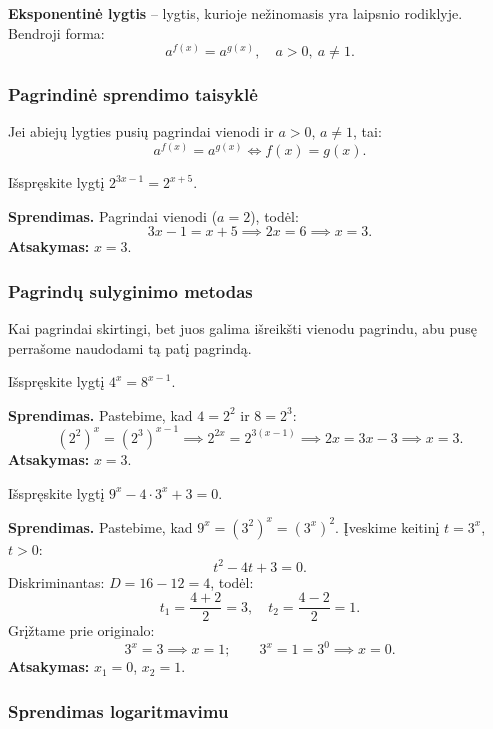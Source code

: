 \begin{definition}
\textbf{Eksponentinė lygtis} – lygtis, kurioje nežinomasis yra laipsnio rodiklyje.
Bendroji forma:
\[
    a^{f(x)} = a^{g(x)}, \quad a > 0,\ a \neq 1.
\]
\end{definition}

\subsubsection*{Pagrindinė sprendimo taisyklė}

Jei abiejų lygties pusių pagrindai vienodi ir $a > 0$, $a \neq 1$, tai:
\[
    a^{f(x)} = a^{g(x)} \iff f(x) = g(x).
\]

\begin{example}
Išspręskite lygtį $2^{3x-1} = 2^{x+5}$.

\textbf{Sprendimas.} Pagrindai vienodi ($a = 2$), todėl:
\[
    3x - 1 = x + 5 \implies 2x = 6 \implies x = 3.
\]
\textbf{Atsakymas:} $x = 3$.
\end{example}

\subsubsection*{Pagrindų sulyginimo metodas}

Kai pagrindai skirtingi, bet juos galima išreikšti vienodu pagrindu, abu pusę
perrašome naudodami tą patį pagrindą.

\begin{example}
Išspręskite lygtį $4^{x} = 8^{x-1}$.

\textbf{Sprendimas.} Pastebime, kad $4 = 2^2$ ir $8 = 2^3$:
\[
    (2^2)^{x} = (2^3)^{x-1}
    \implies 2^{2x} = 2^{3(x-1)}
    \implies 2x = 3x - 3
    \implies x = 3.
\]
\textbf{Atsakymas:} $x = 3$.
\end{example}

\begin{example}
Išspręskite lygtį $9^{x} - 4 \cdot 3^{x} + 3 = 0$.

\textbf{Sprendimas.} Pastebime, kad $9^x = (3^2)^x = (3^x)^2$.
Įveskime keitinį $t = 3^x$, $t > 0$:
\[
    t^2 - 4t + 3 = 0.
\]
Diskriminantas: $D = 16 - 12 = 4$, todėl:
\[
    t_1 = \frac{4 + 2}{2} = 3, \quad t_2 = \frac{4 - 2}{2} = 1.
\]
Grįžtame prie originalo:
\[
    3^x = 3 \implies x = 1; \qquad 3^x = 1 = 3^0 \implies x = 0.
\]
\textbf{Atsakymas:} $x_1 = 0$, $x_2 = 1$.
\end{example}

\subsubsection*{Sprendimas logaritmavimu}

